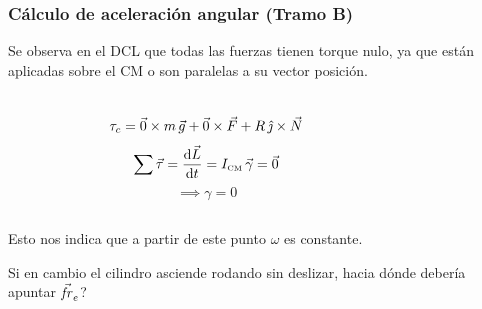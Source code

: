 \begin{frame}
	\frametitle{Cálculo de aceleración angular (Tramo B)}

	Se observa en el DCL que todas las fuerzas tienen torque nulo, ya que están aplicadas sobre el CM o son paralelas a su vector posición.
	\begin{columns}
		\begin{figure}
		\end{figure}
		$$ \tau_c = \vec{0} \times m\,\vec{g} + \vec{0} \times \vec{F} + R\,\hat{\jmath} \times \vec{N} $$
		\begin{equation} \label{eq:torque_conservation}
			\sum{\vec{\tau}} = \frac{\mathrm{d}\vec{L}}{\mathrm{d}t} = I_{\text{\tiny CM}} \,\vec{\gamma} = \vec{0}
		\end{equation}
		$$ \implies \gamma = 0 $$
	\end{columns}
	\vspace{.5cm}
	Esto nos indica que a partir de este punto $\omega$ es constante.

	\vspace{.4cm}
	Si en cambio el cilindro asciende rodando sin deslizar, \textquestiondown hacia dónde debería apuntar $\vec{\mathit{f\kern-0.12em r}}_e$?
\end{frame}

